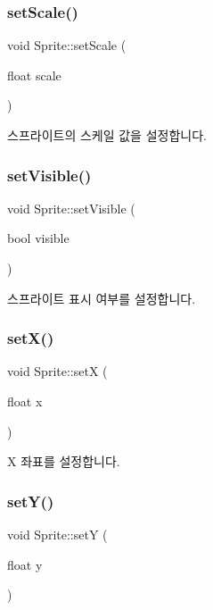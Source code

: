 \subsubsection{\texorpdfstring{setScale()}{setScale()}}
{\footnotesize\ttfamily void Sprite\+::set\+Scale (\begin{DoxyParamCaption}\item[{float}]{scale }\end{DoxyParamCaption})}

스프라이트의 스케일 값을 설정합니다. \mbox{\label{class_sprite_add93d55788046c00deb1d7f0fa2d6ae8}} 
\subsubsection{\texorpdfstring{setVisible()}{setVisible()}}
{\footnotesize\ttfamily void Sprite\+::set\+Visible (\begin{DoxyParamCaption}\item[{bool}]{visible }\end{DoxyParamCaption})}

스프라이트 표시 여부를 설정합니다. \mbox{\label{class_sprite_a83c882524ce2588098faa793773b6113}} 
\subsubsection{\texorpdfstring{setX()}{setX()}}
{\footnotesize\ttfamily void Sprite\+::setX (\begin{DoxyParamCaption}\item[{float}]{x }\end{DoxyParamCaption})}

X 좌표를 설정합니다. \mbox{\label{class_sprite_a042a48623b9c8202662a595fac2d6790}} 
\subsubsection{\texorpdfstring{setY()}{setY()}}
{\footnotesize\ttfamily void Sprite\+::setY (\begin{DoxyParamCaption}\item[{float}]{y }\end{DoxyParamCaption})}

